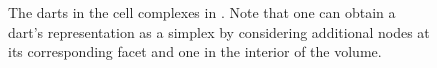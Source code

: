 \begin{figure}[tbp]
\centering
{}
\quad
{}
\caption[The darts in the cell complexes in .]{The darts in the cell complexes in .
Note that one can obtain a dart's representation as a simplex by considering additional nodes at its corresponding facet and one in the interior of the volume.}
\label{fig:triangle}
\end{figure}

